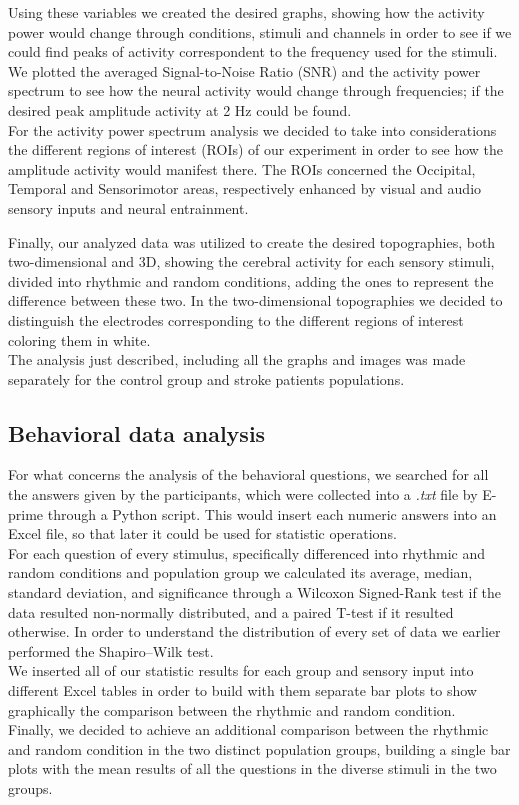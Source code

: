 Using these variables we created the desired graphs, showing how the activity power would change through conditions, stimuli and channels in order to see if we could find peaks of activity correspondent to the frequency used for the stimuli. We plotted the averaged Signal-to-Noise Ratio (SNR) and the activity power spectrum to see how the neural activity would change through frequencies; if the desired peak amplitude activity at 2 Hz could be found. \\
For the activity power spectrum analysis we decided to take into considerations the different regions of interest (ROIs) of our experiment in order to see how the amplitude activity would manifest there. The ROIs concerned the Occipital, Temporal and Sensorimotor areas, respectively enhanced by visual and audio sensory inputs and neural entrainment.

Finally, our analyzed data was utilized to create the desired topographies, both two-dimensional and 3D, showing the cerebral activity for each sensory stimuli, divided into rhythmic and random conditions, adding the ones to represent the difference between these two. In the two-dimensional topographies we decided to distinguish the electrodes corresponding to the different regions of interest coloring them in white.\\
The analysis just described, including all the graphs and images was made separately for the control group and stroke patients populations. 

\subsection{Behavioral data analysis}
For what concerns the analysis of the behavioral questions, we searched for all the answers given by the participants, which were collected into a \textit{.txt} file by E-prime through a Python script. This would insert each numeric answers into an Excel file, so that later it could be used for statistic operations. \\
For each question of every stimulus, specifically differenced into rhythmic and random conditions and population group we calculated its average, median, standard deviation, and significance through a Wilcoxon Signed-Rank test if the data resulted non-normally distributed, and a paired T-test if it resulted otherwise. In order to understand the distribution of every set of data we earlier performed the Shapiro–Wilk test. \\
We inserted all of our statistic results for each group and sensory input into different Excel tables in order to build with them separate bar plots to show graphically the comparison between the rhythmic and random condition. \\
Finally, we decided to achieve an additional comparison between the rhythmic and random condition in the two distinct population groups, building a single bar plots with the mean results of all the questions in the diverse stimuli in the two groups. 

